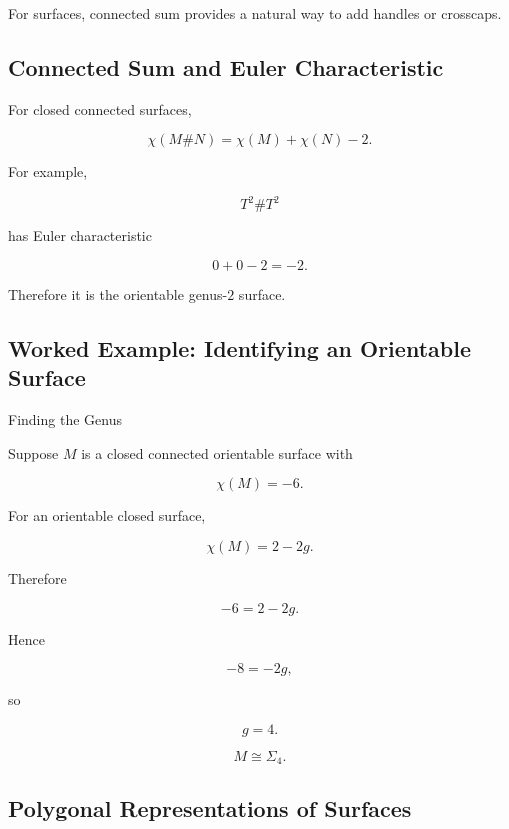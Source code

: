 For surfaces, connected sum provides a natural way to add handles or
crosscaps.

\subsection{Connected Sum and Euler Characteristic}
\label{subsec:connected-sum-euler}

For closed connected surfaces,

\[
\boxed{
\chi(M\#N)
=
\chi(M)+\chi(N)-2.
}
\]

For example,

\[
T^2\#T^2
\]

has Euler characteristic

\[
0+0-2=-2.
\]

Therefore it is the orientable genus-\(2\) surface.

\subsection{Worked Example: Identifying an Orientable Surface}
\label{subsec:worked-identifying-surface}

\begin{workedexamplebox}{Finding the Genus}

Suppose \(M\) is a closed connected orientable surface with

\[
\chi(M)=-6.
\]

For an orientable closed surface,

\[
\chi(M)=2-2g.
\]

Therefore

\[
-6=2-2g.
\]

Hence

\[
-8=-2g,
\]

so

\[
g=4.
\]

\begin{answerbox}
\[
\boxed{
M\cong\Sigma_4.
}
\]
\end{answerbox}
\end{workedexamplebox}

\subsection{Polygonal Representations of Surfaces}
\label{subsec:polygonal-representations}

